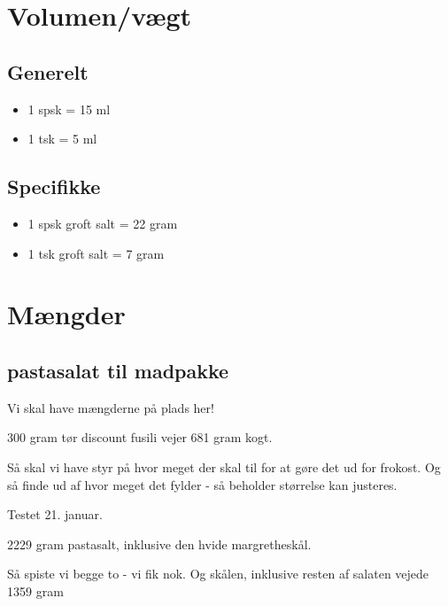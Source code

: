 \documentclass[
  letterpaper,
  DIV=11,
  numbers=noendperiod]{scrreprt}
\providecommand{\tightlist}{%
  \setlength{\itemsep}{0pt}\setlength{\parskip}{0pt}}\usepackage{longtable,booktabs,array}
\begin{document}
\hypertarget{volumenvuxe6gt}{%
\section{Volumen/vægt}\label{volumenvuxe6gt}}

\hypertarget{generelt}{%
\subsection{Generelt}\label{generelt}}

\begin{itemize}
\tightlist
\item
  1 spsk = 15 ml
\item
  1 tsk = 5 ml
\end{itemize}

\hypertarget{specifikke}{%
\subsection{Specifikke}\label{specifikke}}

\begin{itemize}
\tightlist
\item
  1 spsk groft salt = 22 gram
\item
  1 tsk groft salt = 7 gram
\end{itemize}

\hypertarget{muxe6ngder}{%
\section{Mængder}\label{muxe6ngder}}

\hypertarget{pastasalat-til-madpakke}{%
\subsection{pastasalat til madpakke}\label{pastasalat-til-madpakke}}

Vi skal have mængderne på plads her!

300 gram tør discount fusili vejer 681 gram kogt.

Så skal vi have styr på hvor meget der skal til for at gøre det ud for
frokost. Og så finde ud af hvor meget det fylder - så beholder størrelse
kan justeres.

Testet 21. januar.

2229 gram pastasalt, inklusive den hvide margretheskål.

Så spiste vi begge to - vi fik nok. Og skålen, inklusive resten af
salaten vejede 1359 gram
\end{document}
